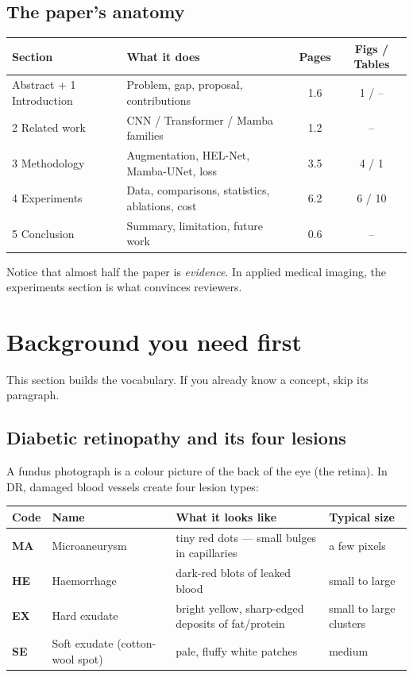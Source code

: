 \documentclass[11pt,a4paper]{article}
\begin{document}
\subsection*{The paper's anatomy}
\begin{center}
\small
\begin{tabular}{@{}llcc@{}}
\toprule
Section & What it does & Pages & Figs / Tables\\
\midrule
Abstract + 1 Introduction & Problem, gap, proposal, contributions & 1.6 & 1 / -- \\
2 Related work & CNN / Transformer / Mamba families & 1.2 & -- \\
3 Methodology & Augmentation, HEL-Net, Mamba-UNet, loss & 3.5 & 4 / 1\\
4 Experiments & Data, comparisons, statistics, ablations, cost & 6.2 & 6 / 10\\
5 Conclusion & Summary, limitation, future work & 0.6 & -- \\
\bottomrule
\end{tabular}
\end{center}
Notice that almost half the paper is \emph{evidence}. In applied medical imaging, the experiments
section is what convinces reviewers.

\section{Background you need first}
This section builds the vocabulary. If you already know a concept, skip its paragraph.

\subsection{Diabetic retinopathy and its four lesions}
A fundus photograph is a colour picture of the back of the eye (the retina). In DR, damaged
blood vessels create four lesion types:

\begin{center}
\small
\begin{tabularx}{\linewidth}{@{}l l X l@{}}
\toprule
Code & Name & What it looks like & Typical size\\
\midrule
\textbf{MA} & Microaneurysm & tiny red dots --- small bulges in capillaries & a few pixels\\
\textbf{HE} & Haemorrhage & dark-red blots of leaked blood & small to large\\
\textbf{EX} & Hard exudate & bright yellow, sharp-edged deposits of fat/protein & small to large clusters\\
\textbf{SE} & Soft exudate (cotton-wool spot) & pale, fluffy white patches & medium\\
\bottomrule
\end{tabularx}
\end{center}
\end{document}

